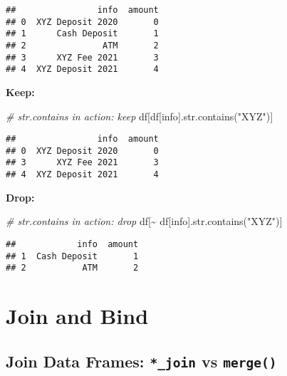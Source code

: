 \documentclass[
]{book}
\newenvironment{Shaded}{\begin{snugshade}}{\end{snugshade}}
\newcommand{\BuiltInTok}[1]{#1}
\newcommand{\CommentTok}[1]{\textcolor[rgb]{0.56,0.35,0.01}{\textit{#1}}}
\newcommand{\NormalTok}[1]{#1}
\newcommand{\OperatorTok}[1]{\textcolor[rgb]{0.81,0.36,0.00}{\textbf{#1}}}
\newcommand{\StringTok}[1]{\textcolor[rgb]{0.31,0.60,0.02}{#1}}
\begin{document}
\begin{verbatim}
##                info  amount
## 0  XYZ Deposit 2020       0
## 1      Cash Deposit       1
## 2               ATM       2
## 3      XYZ Fee 2021       3
## 4  XYZ Deposit 2021       4
\end{verbatim}

\textbf{Keep:}

\begin{Shaded}
\begin{Highlighting}[]
\CommentTok{\# str.contains in action: keep}
\NormalTok{df[df[}\StringTok{\textquotesingle{}info\textquotesingle{}}\NormalTok{].}\BuiltInTok{str}\NormalTok{.contains(}\StringTok{"XYZ"}\NormalTok{)]}
\end{Highlighting}
\end{Shaded}

\begin{verbatim}
##                info  amount
## 0  XYZ Deposit 2020       0
## 3      XYZ Fee 2021       3
## 4  XYZ Deposit 2021       4
\end{verbatim}

\textbf{Drop:}

\begin{Shaded}
\begin{Highlighting}[]
\CommentTok{\# str.contains in action: drop}
\NormalTok{df[}\OperatorTok{\textasciitilde{}}\NormalTok{ df[}\StringTok{\textquotesingle{}info\textquotesingle{}}\NormalTok{].}\BuiltInTok{str}\NormalTok{.contains(}\StringTok{"XYZ"}\NormalTok{)]}
\end{Highlighting}
\end{Shaded}

\begin{verbatim}
##            info  amount
## 1  Cash Deposit       1
## 2           ATM       2
\end{verbatim}

\hypertarget{join-and-bind}{%
\chapter{Join and Bind}\label{join-and-bind}}

\hypertarget{join-data-frames-_join-vs-merge}{%
\section{\texorpdfstring{Join Data Frames: \texttt{*\_join} vs \texttt{merge()}}{Join Data Frames: *\_join vs merge()}}\label{join-data-frames-_join-vs-merge}}
\end{document}
